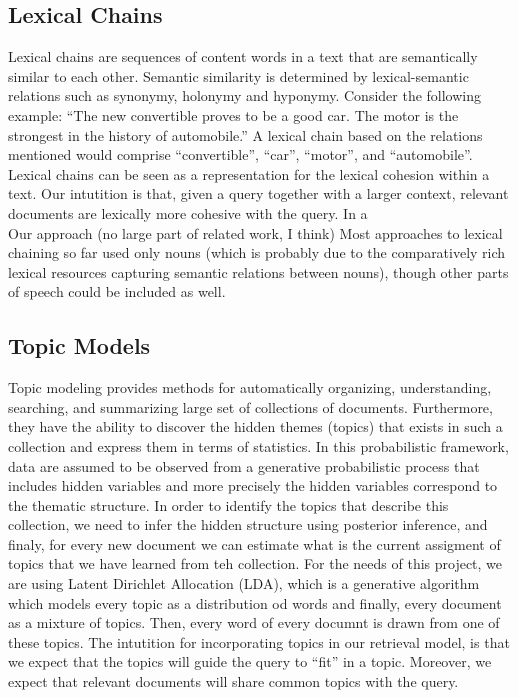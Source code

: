 \documentclass[11pt, a4paper, abstraction]{scrartcl}
\begin{document}
\subsection{Lexical Chains}

Lexical chains are sequences of content words in a text that are semantically similar to each other. Semantic similarity is determined by lexical-semantic relations such as synonymy, holonymy and hyponymy. Consider the following example: ``The new convertible proves to be a good car. The motor is the strongest in the history of automobile.''
A lexical chain based on the relations mentioned would comprise ``convertible'', ``car'', ``motor'', and ``automobile''. Lexical chains can be seen as a representation for the lexical cohesion within a text. Our intutition is that, given a query together with a larger context, relevant documents are lexically more cohesive with the query. In a \\
Our approach (no large part of related work, I think)
Most approaches to lexical chaining so far used only nouns (which is probably due to the comparatively rich lexical resources capturing semantic relations between nouns), though other parts of speech could be included as well. \\ 



\subsection{Topic Models}
Topic modeling provides methods for automatically organizing, understanding, searching, and summarizing large set of collections of documents. Furthermore, they have the ability to discover the hidden themes (topics) that exists in such a collection and express them in terms of statistics. In this probabilistic framework, data are assumed to be observed from a generative probabilistic process that includes hidden variables and more precisely the hidden variables correspond to the thematic structure. In order to identify the topics that describe this collection, we need to infer the hidden structure using posterior inference, and finaly, for every new document we can estimate what is the current assigment of topics that we have learned from teh collection. 
For the needs of this project, we are using Latent Dirichlet Allocation (LDA), which is a generative algorithm which models every topic as a distribution od words and finally, every document as a mixture of topics. Then, every word of every documnt is drawn from one of these topics. 
The intutition for incorporating topics in our retrieval model, is that we expect that the topics will guide the query to ``fit'' in a topic. Moreover, we expect that relevant documents will share common topics with the query.
\end{document}
